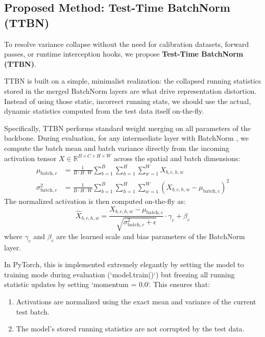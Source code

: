 \documentclass{article}
\theoremstyle{plain}
\theoremstyle{definition}
\theoremstyle{remark}
\begin{document}
\subsection{Proposed Method: Test-Time BatchNorm (TTBN)}
\label{sec:ttbn}

To resolve variance collapse without the need for calibration datasets, forward passes, or runtime interception hooks, we propose \textbf{Test-Time BatchNorm (TTBN)}.

TTBN is built on a simple, minimalist realization: the collapsed running statistics stored in the merged BatchNorm layers are what drive representation distortion. Instead of using those static, incorrect running stats, we should use the actual, dynamic statistics computed from the test data itself on-the-fly.

Specifically, TTBN performs standard weight merging on all parameters of the backbone. During evaluation, for any intermediate layer with BatchNorm \cite{ioffe2015batch}, we compute the batch mean and batch variance directly from the incoming activation tensor $X \in \mathbb{R}^{B \times C \times H \times W}$ across the spatial and batch dimensions:
\begin{align}
    \mu_{\text{batch}, c} &= \frac{1}{B \cdot H \cdot W} \sum_{b=1}^B \sum_{h=1}^H \sum_{w=1}^W X_{b, c, h, w} \\
    \sigma^2_{\text{batch}, c} &= \frac{1}{B \cdot H \cdot W} \sum_{b=1}^B \sum_{h=1}^H \sum_{w=1}^W (X_{b, c, h, w} - \mu_{\text{batch}, c})^2
\end{align}
The normalized activation is then computed on-the-fly as:
\begin{equation}
    \hat{X}_{b, c, h, w} = \frac{X_{b, c, h, w} - \mu_{\text{batch}, c}}{\sqrt{\sigma^2_{\text{batch}, c} + \epsilon}} \cdot \gamma_c + \beta_c
\end{equation}
where $\gamma_c$ and $\beta_c$ are the learned scale and bias parameters of the BatchNorm layer.

In PyTorch, this is implemented extremely elegantly by setting the model to training mode during evaluation (`model.train()`) but freezing all running statistic updates by setting `momentum = 0.0`. This ensures that:
\begin{enumerate}
    \item Activations are normalized using the exact mean and variance of the current test batch.
    \item The model's stored running statistics are not corrupted by the test data.
\end{enumerate}
\end{document}

